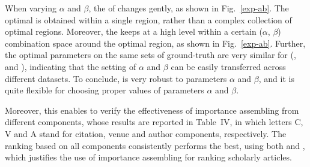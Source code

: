 When varying $\alpha$ and $\beta$, the \PairAcc of \ensemblerank changes gently, as shown in Fig.~\ref{exp-ab}.
The optimal \PairAcc is obtained within a single region, rather than a complex collection of optimal regions.
%
Moreover, the \PairAcc keeps at a high level within a certain ($\alpha$, $\beta$) combination space around the optimal region, as shown in Fig.~\ref{exp-ab}.
%
Further, the optimal parameters on the same sets of ground-truth are very similar for (\aan, \aminer and \magdata), indicating that the setting of $\alpha$ and $\beta$ can be easily transferred across different datasets.
To conclude, \ensemblerank is very robust to parameters $\alpha$ and $\beta$, and it is quite flexible for choosing proper values of parameters $\alpha$ and $\beta$.

Moreover, this enables to verify the effectiveness of importance assembling from different components, whose results are reported in Table~IV, in which letters C, V and A stand for citation, venue and author components, respectively.
The ranking based on all components consistently performs the best, using both \recom and \fcita, which justifies the use of importance assembling for ranking scholarly articles.



